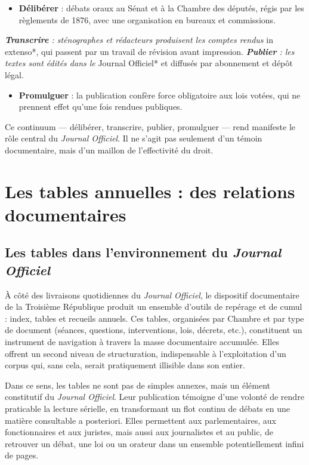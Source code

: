 \begin{itemize}
\item \textbf{Délibérer} : débats oraux au Sénat et à la Chambre des députés, régis par les règlements de 1876, avec une organisation en bureaux et commissions.
\end{itemize}
\emph{ \textbf{Transcrire} : sténographes et rédacteurs produisent les comptes rendus }in extenso*, qui passent par un travail de révision avant impression.
\emph{ \textbf{Publier} : les textes sont édités dans le }Journal Officiel* et diffusés par abonnement et dépôt légal.
\begin{itemize}
\item \textbf{Promulguer} : la publication confère force obligatoire aux lois votées, qui ne prennent effet qu’une fois rendues publiques.

\end{itemize}
Ce continuum — délibérer, transcrire, publier, promulguer — rend manifeste le rôle central du \emph{Journal Officiel}. Il ne s’agit pas seulement d’un témoin documentaire, mais d’un maillon de l’effectivité du droit.

\chapter{Les tables annuelles : des relations documentaires}

\section{Les tables dans l’environnement du \emph{Journal Officiel}}

À côté des livraisons quotidiennes du \emph{Journal Officiel}, le dispositif documentaire de la Troisième République produit un ensemble d’outils de repérage et de cumul : index, tables et recueils annuels. Ces tables, organisées par Chambre et par type de document (séances, questions, interventions, lois, décrets, etc.), constituent un instrument de navigation à travers la masse documentaire accumulée. Elles offrent un second niveau de structuration, indispensable à l’exploitation d’un corpus qui, sans cela, serait pratiquement illisible dans son entier.

Dans ce sens, les tables ne sont pas de simples annexes, mais un élément constitutif du \emph{Journal Officiel}. Leur publication témoigne d’une volonté de rendre praticable la lecture sérielle, en transformant un flot continu de débats en une matière consultable a posteriori. Elles permettent aux parlementaires, aux fonctionnaires et aux juristes, mais aussi aux journalistes et au public, de retrouver un débat, une loi ou un orateur dans un ensemble potentiellement infini de pages.

